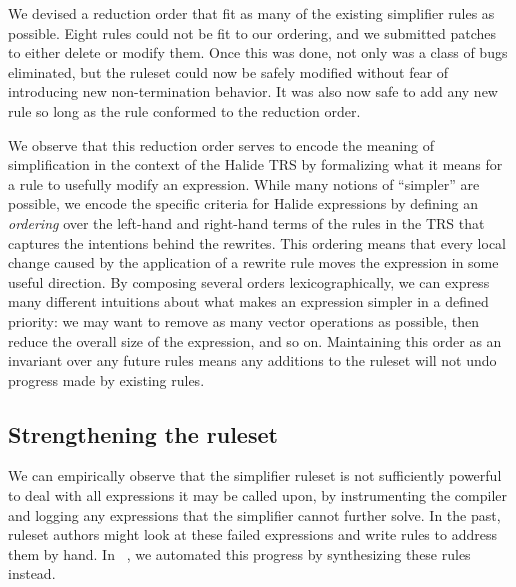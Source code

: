 We devised a reduction order that fit as many of the existing simplifier rules as possible. Eight rules could not be fit to our ordering, and we submitted patches to either delete or modify them. Once this was done, not only was a class of bugs eliminated, but the ruleset could now be safely modified without fear of introducing new non-termination behavior. It was also now safe to add any new rule so long as the rule conformed to the reduction order. 

We observe that this reduction order serves to encode the meaning of simplification in the context of the Halide TRS
by formalizing what it means for a rule to usefully modify an expression.  While
many notions of ``simpler'' are possible, we encode the specific criteria for Halide
expressions by defining an \emph{ordering} over the left-hand and right-hand terms of 
the rules in the TRS that captures the intentions behind the rewrites. This ordering 
means that every local change caused by the application of a rewrite rule moves the 
expression in some useful direction. By composing several orders lexicographically, 
we can express many different intuitions about what makes an expression simpler in a
defined priority: we may want to remove as many vector operations as possible, 
then reduce the overall size of the expression, and so on. Maintaining this order as 
an invariant over any future rules means any additions to the ruleset will not undo 
progress made by existing rules.

\subsection{Strengthening the ruleset}
We can empirically observe that the simplifier ruleset is not sufficiently powerful to deal with all expressions it may be called upon, by instrumenting the compiler and logging any expressions that the simplifier cannot further solve. In the past, ruleset authors might look at these failed expressions and write rules to address them by hand. In ~\citep{newcomb2020verifying}, we automated this progress by synthesizing these rules instead.

